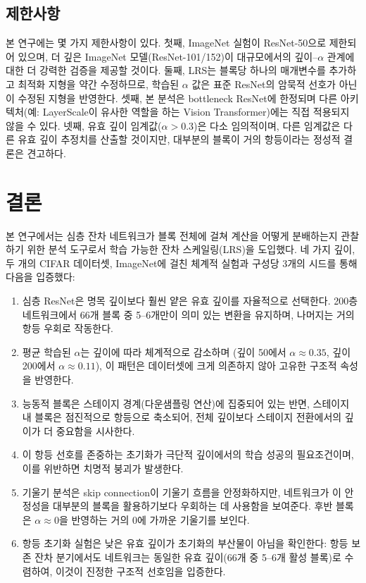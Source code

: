 \documentclass[preprint,12pt]{elsarticle}
\begin{document}
\subsection{제한사항}

본 연구에는 몇 가지 제한사항이 있다. 첫째, ImageNet 실험이 ResNet-50으로 제한되어 있으며, 더 깊은 ImageNet 모델(ResNet-101/152)이 대규모에서의 깊이--$\alpha$ 관계에 대한 더 강력한 검증을 제공할 것이다. 둘째, LRS는 블록당 하나의 매개변수를 추가하고 최적화 지형을 약간 수정하므로, 학습된 $\alpha$ 값은 표준 ResNet의 암묵적 선호가 아닌 이 수정된 지형을 반영한다. 셋째, 본 분석은 bottleneck ResNet에 한정되며 다른 아키텍처(예: LayerScale이 유사한 역할을 하는 Vision Transformer)에는 직접 적용되지 않을 수 있다. 넷째, 유효 깊이 임계값($\alpha > 0.3$)은 다소 임의적이며, 다른 임계값은 다른 유효 깊이 추정치를 산출할 것이지만, 대부분의 블록이 거의 항등이라는 정성적 결론은 견고하다.

\section{결론}
\label{sec:conclusion}

본 연구에서는 심층 잔차 네트워크가 블록 전체에 걸쳐 계산을 어떻게 분배하는지 관찰하기 위한 분석 도구로서 학습 가능한 잔차 스케일링(LRS)을 도입했다. 네 가지 깊이, 두 개의 CIFAR 데이터셋, ImageNet에 걸친 체계적 실험과 구성당 3개의 시드를 통해 다음을 입증했다:

\begin{enumerate}
    \item 심층 ResNet은 명목 깊이보다 훨씬 얕은 유효 깊이를 자율적으로 선택한다. 200층 네트워크에서 66개 블록 중 5--6개만이 의미 있는 변환을 유지하며, 나머지는 거의 항등 우회로 작동한다.
    \item 평균 학습된 $\alpha$는 깊이에 따라 체계적으로 감소하며 (깊이 50에서 $\alpha \approx 0.35$, 깊이 200에서 $\alpha \approx 0.11$), 이 패턴은 데이터셋에 크게 의존하지 않아 고유한 구조적 속성을 반영한다.
    \item 능동적 블록은 스테이지 경계(다운샘플링 연산)에 집중되어 있는 반면, 스테이지 내 블록은 점진적으로 항등으로 축소되어, 전체 깊이보다 스테이지 전환에서의 깊이가 더 중요함을 시사한다.
    \item 이 항등 선호를 존중하는 초기화가 극단적 깊이에서의 학습 성공의 필요조건이며, 이를 위반하면 치명적 붕괴가 발생한다.
    \item 기울기 분석은 skip connection이 기울기 흐름을 안정화하지만, 네트워크가 이 안정성을 대부분의 블록을 활용하기보다 우회하는 데 사용함을 보여준다. 후반 블록은 $\alpha \approx 0$을 반영하는 거의 0에 가까운 기울기를 보인다.
    \item 항등 초기화 실험은 낮은 유효 깊이가 초기화의 부산물이 아님을 확인한다: 항등 보존 잔차 분기에서도 네트워크는 동일한 유효 깊이(66개 중 5--6개 활성 블록)로 수렴하여, 이것이 진정한 구조적 선호임을 입증한다.
\end{enumerate}
\end{document}
